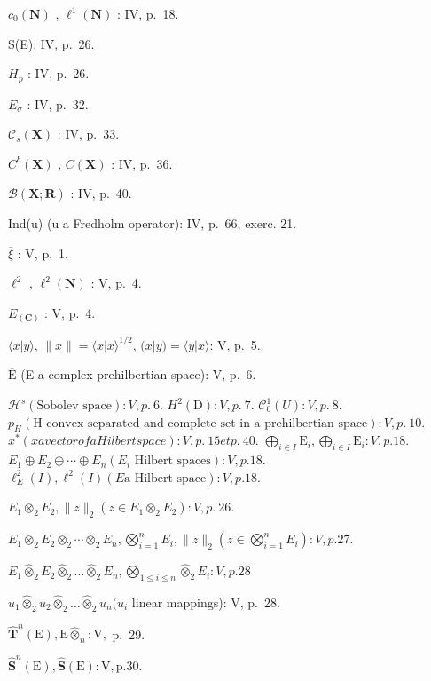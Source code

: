 \(c_{0}(\mathbf{N})\) , \(\ell^{1}(\mathbf{N})\) : IV, p.~18.

S(E): IV, p.~26.

\(H_{p}\) : IV, p.~26.

\(E_{\sigma}\) : IV, p.~32.

\(\mathcal{C}_{s}(\mathbf{X})\) : IV, p.~33.

\(C^{b}(\mathbf{X})\) , \(C(\mathbf{X})\) : IV, p.~36.

\(\mathcal{B}(\mathbf{X};\mathbf{R})\) : IV, p.~40.

Ind(u) (u a Fredholm operator): IV, p.~66, exerc. 21.

\(\overline{\xi}\) : V, p.~1.

\(\ell^{2}\) , \(\ell^{2}(\mathbf{N})\) : V, p.~4.

\(E_{(\mathbf{C})}\) : V, p.~4.

\(\langle x|y\rangle\), \(\|x\| = \langle x|x\rangle^{1/2}\), \((x|y) = \langle y|x\rangle\): V, p.~5.

\(\overline{\mathrm{E}}\) (E a complex prehilbertian space): V, p.~6.

\(\mathcal{H}^{s} (\text {Sobolev space}): V, p.~6.\) \(H^{2}(\text {D}): V, p.~7.\) \(\mathcal{C}_{0}^{1}(U): V, p.~8.\) \(p_{H} (\text {H convex separated and complete set in a prehilbertian space}): V, p.~10.\) \(x^{*} (x a vector of a Hilbert space): V, p.~15 et p.~40.\) \(\bigoplus_{i\in I}\mathrm{E}_{i},\bigoplus_{i\in I}\mathrm{E}_{i}:V,p.18.\) \(E_{1}\oplus E_{2}\oplus\cdots\oplus E_{n} (E_{i}\text { Hilbert spaces}):V,p.18.\) \(\ell_{E}^{2}(I),\ell^{2}(I)(E\text {a Hilbert space}):V,p.18.\)

\(E_{1} \otimes_{2} E_{2}, \|z\|_{2} (z \in E_{1} \otimes_{2} E_{2}) : V, p.~26.\)

\(E_{1} \otimes_{2} E_{2} \otimes_{2} \cdots \otimes_{2} E_{n}, \bigotimes_{i=1}^{n} E_{i}, \|z\|_{2} \left( z \in \bigotimes_{i=1}^{n} E_{i} \right) : V, p. 27.\)

\(E_{1} \hat{\otimes}_{2} E_{2} \hat{\otimes}_{2} \ldots \hat{\otimes}_{2} E_{n}, \bigotimes_{1 \leqslant i \leqslant n} \hat{\otimes}_{2} E_{i}: V, p. 28\)

\(u_{1}\hat{\otimes}_{2}u_{2}\hat{\otimes}_{2}\ldots \hat{\otimes}_{2}u_{n}(u_{i}\) linear mappings): V, p.~28.

\(\hat{\mathbf{T}}^n (\mathrm{E}),\mathrm{E}\hat{\otimes}_n:\mathrm{V},\) p.~29.

\(\hat{\mathbf{S}}^{n}(\mathrm{E}), \hat{\mathbf{S}}(\mathrm{E}) : \mathrm{V}, \mathrm{p.} 30.\)

